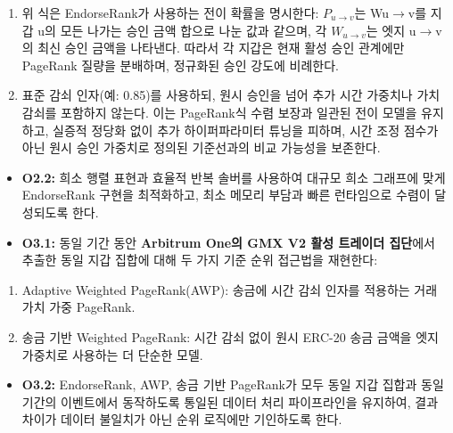 \begin{enumerate}
\item[(b)] 위 식은 EndorseRank가 사용하는 전이 확률을 명시한다: $P_{u\to v}$는 Wu\(\to\)v를 지갑 u의 모든 나가는 승인 금액 합으로 나눈 값과 같으며, 각 $W_{u\to v}$는 엣지 u\(\to\)v의 최신 승인 금액을 나타낸다. 따라서 각 지갑은 현재 활성 승인 관계에만 PageRank 질량을 분배하며, 정규화된 승인 강도에 비례한다.
\item[(c)] 표준 감쇠 인자(예: 0.85)를 사용하되, 원시 승인을 넘어 추가 시간 가중치나 가치 감쇠를 포함하지 않는다. 이는 PageRank식 수렴 보장과 일관된 전이 모델을 유지하고, 실증적 정당화 없이 추가 하이퍼파라미터 튜닝을 피하며, 시간 조정 점수가 아닌 원시 승인 가중치로 정의된 기준선과의 비교 가능성을 보존한다.
\end{enumerate}
\begin{itemize}
\item[\textbullet] \textbf{O2.2: }희소 행렬 표현과 효율적 반복 솔버를 사용하여 대규모 희소 그래프에 맞게 EndorseRank 구현을 최적화하고, 최소 메모리 부담과 빠른 런타임으로 수렴이 달성되도록 한다.
\end{itemize}

\begin{itemize}
\item[\textbullet] \textbf{O3.1: }동일 기간 동안 \textbf{Arbitrum One의 GMX V2 활성 트레이더 집단}에서 추출한 동일 지갑 집합에 대해 두 가지 기준 순위 접근법을 재현한다:
\end{itemize}
\begin{enumerate}
\item[(a)] Adaptive Weighted PageRank(AWP): 송금에 시간 감쇠 인자를 적용하는 거래 가치 가중 PageRank.
\item[(b)] 송금 기반 Weighted PageRank: 시간 감쇠 없이 원시 ERC-20 송금 금액을 엣지 가중치로 사용하는 더 단순한 모델.
\end{enumerate}
\begin{itemize}
\item[\textbullet] \textbf{O3.2: }EndorseRank, AWP, 송금 기반 PageRank가 모두 동일 지갑 집합과 동일 기간의 이벤트에서 동작하도록 통일된 데이터 처리 파이프라인을 유지하여, 결과 차이가 데이터 불일치가 아닌 순위 로직에만 기인하도록 한다.
\end{itemize}

